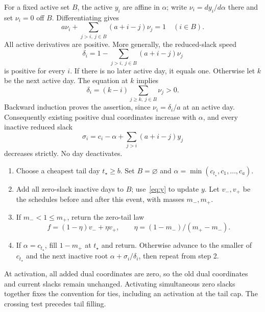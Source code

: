 \documentclass[manuscript,11pt,screen,nonacm]{acmart}
\begin{document}
For a fixed active set $B$, the active $y_i$ are affine in $\alpha$;
write $\nu_i=dy_i/d\alpha$ there and set $\nu_i=0$ off $B$. Differentiating gives
\begin{equation}\label{eq:speed}
 a\nu_i+\sum_{j>i,\ j\in B}(a+i-j)\nu_j=1\quad(i\in B).
\end{equation}
All active derivatives are positive. More generally, the reduced-slack
speed
\[
 \delta_i=1-\sum_{j>i,\ j\in B}(a+i-j)\nu_j
\]
is positive for every $i$. If there is no later active day, it equals one.
Otherwise let $k$ be the next active day. The equation at $k$ implies
\begin{equation}\label{eq:positive}
 \delta_i=(k-i)\sum_{j\ge k,\ j\in B}\nu_j>0.
\end{equation}
Backward induction proves the assertion, since $\nu_i=\delta_i/a$ at an active
day. Consequently existing positive dual coordinates increase with
$\alpha$, and every inactive reduced slack
\[
 \sigma_i=c_i-\alpha+\sum_{j>i}(a+i-j)y_j
\]
decreases strictly. No day deactivates.

\begin{algorithm}[ht]
\caption{Normalized prefix sweep: costs $c$ on $S$; output $f,\alpha,y$.}
\label{alg:sweep}
\begin{enumerate}
\item Choose a cheapest tail day $t_\star\ge b$. Set $B=\varnothing$ and
$\alpha=\min(c_{t_\star},c_1,\ldots,c_a)$.
\item Add all zero-slack inactive days to $B$; use~\eqref{eq:y} to update
$y$. Let $v_-,v_+$ be the schedules before and after this event, with
masses $m_-,m_+$.
\item If $m_-<1\le m_+$, return the zero-tail law
\begin{equation}\label{eq:massmix}
 f=(1-\eta)v_-+\eta v_+,\qquad \eta=(1-m_-)/(m_+-m_-).
\end{equation}
\item If $\alpha=c_{t_\star}$, fill $1-m_+$ at $t_\star$ and return.
Otherwise advance to the smaller of $c_{t_\star}$ and the next inactive
root $\alpha+\sigma_i/\delta_i$, then repeat from step 2.
\end{enumerate}
\end{algorithm}
At activation, all added dual coordinates are zero, so the old dual
coordinates and current slacks remain unchanged. Activating simultaneous
zero slacks together fixes the convention for ties, including an activation
at the tail cap. The crossing test precedes tail filling.
\end{document}

